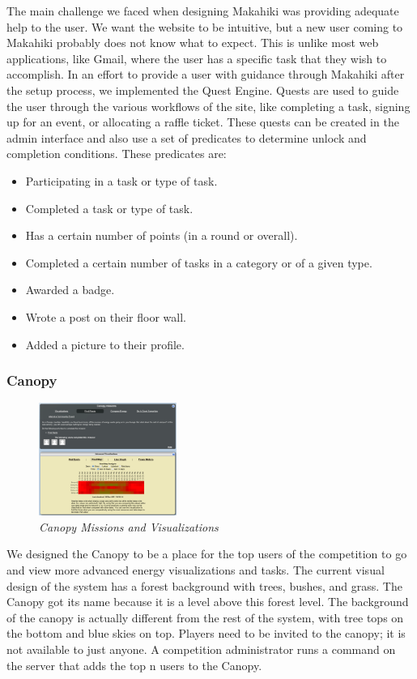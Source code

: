 \documentclass{acm_proc_article-sp}
\begin{document}
The main challenge we faced when designing Makahiki was providing adequate help to the user. We want the website to be intuitive, but a new user coming to Makahiki probably does not know what to expect. This is unlike most web applications, like Gmail, where the user has a specific task that they wish to accomplish. In an effort to provide a user with guidance through Makahiki after the setup process, we implemented the Quest Engine. Quests are used to guide the user through the various workflows of the site, like completing a task, signing up for an event, or allocating a raffle ticket. These quests can be created in the admin interface and also use a set of predicates to determine unlock and completion conditions. These predicates are:

\begin{itemize}
  \item Participating in a task or type of task.
  \item Completed a task or type of task.
  \item Has a certain number of points (in a round or overall).
  \item Completed a certain number of tasks in a category or of a given type.
  \item Awarded a badge.
  \item Wrote a post on their floor wall.
  \item Added a picture to their profile.
\end{itemize}

\subsubsection{Canopy}

\begin{figure}[ht!]
  \center
  \includegraphics[width=0.4\textwidth]{canopy-missions-visualizations.eps}
  \caption{\em \small Canopy Missions and Visualizations}
  \label{fig:CanopyMissions}
\end{figure}

We designed the Canopy to be a place for the top users of the competition to go and view more advanced energy visualizations and tasks. The current visual design of the system has a forest background with trees, bushes, and grass. The Canopy got its name because it is a level above this forest level. The background of the canopy is actually different from the rest of the system, with tree tops on the bottom and blue skies on top. Players need to be invited to the canopy; it is not available to just anyone. A competition administrator runs a command on the server that adds the top n users to the Canopy.
\end{document}
